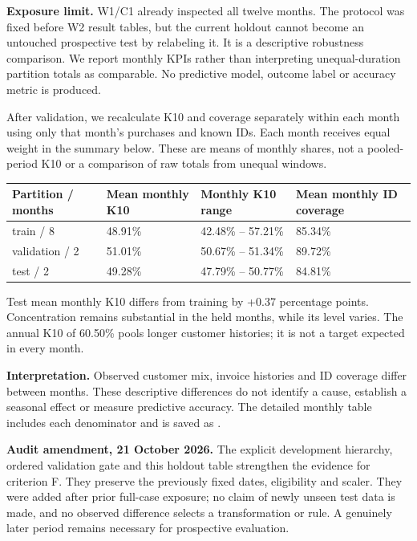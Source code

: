 \documentclass[10pt,a4paper]{article}
\newcommand{\sectionhead}[1]{\Needspace{8\baselineskip}\vspace{.4em}{\large\bfseries\color{navy}#1}\par\vspace{.1em}}
\begin{document}
\textbf{Exposure limit.} W1/C1 already inspected all twelve months. The protocol was fixed before W2 result tables, but the current holdout cannot become an untouched prospective test by relabeling it. It is a descriptive robustness comparison. We report monthly KPIs rather than interpreting unequal-duration partition totals as comparable. No predictive model, outcome label or accuracy metric is produced.
\clearpage
\sectionhead{7\quad Temporal holdout: descriptive findings}
After validation, we recalculate K10 and coverage separately within each month using only that month's purchases and known IDs. Each month receives equal weight in the summary below. These are means of monthly shares, not a pooled-period K10 or a comparison of raw totals from unequal windows.

\begin{tabularx}{\linewidth}{@{}YYYY@{}}
\toprule
\textbf{Partition / months} & \textbf{Mean monthly K10} & \textbf{Monthly K10 range} & \textbf{Mean monthly ID coverage} \\ \midrule
train / 8 & 48.91\% & 42.48\% -- 57.21\% & 85.34\% \\
validation / 2 & 51.01\% & 50.67\% -- 51.34\% & 89.72\% \\
test / 2 & 49.28\% & 47.79\% -- 50.77\% & 84.81\% \\
\bottomrule\end{tabularx}

Test mean monthly K10 differs from training by +0.37 percentage points. Concentration remains substantial in the held months, while its level varies. The annual K10 of 60.50\% pools longer customer histories; it is not a target expected in every month.

\textbf{Interpretation.} Observed customer mix, invoice histories and ID coverage differ between months. These descriptive differences do not identify a cause, establish a seasonal effect or measure predictive accuracy. The detailed monthly table includes each denominator and is saved as .

\textbf{Audit amendment, 21 October 2026.} The explicit development hierarchy, ordered validation gate and this holdout table strengthen the evidence for criterion F. They preserve the previously fixed dates, eligibility and scaler. They were added after prior full-case exposure; no claim of newly unseen test data is made, and no observed difference selects a transformation or rule. A genuinely later period remains necessary for prospective evaluation.
\end{document}
